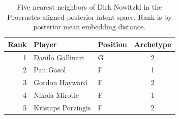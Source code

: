 \begin{table}[htbp]
  \centering\small
  \begin{tabular}{rllc}
    \toprule
    Rank & Player & Position & Archetype \\
    \midrule
    1 & Danilo Gallinari & G & 2 \\
    2 & Pau Gasol & F & 1 \\
    3 & Gordon Hayward & F & 2 \\
    4 & Nikola Mirotic & F & 1 \\
    5 & Kristaps Porzingis & F & 2 \\
    \bottomrule
  \end{tabular}
  \caption{Five nearest neighbors of Dirk Nowitzki in the Procrustes-aligned posterior latent space. Rank is by posterior mean embedding distance.}
  \label{tab:Dirk_Nowitzki_neighbors}
\end{table}

